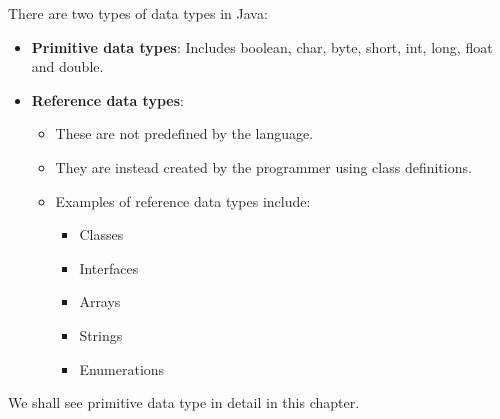 \setlength{\columnsep}{5pt}

\begin{flushleft}
	
	There are two types of data types in Java:
	
	\begin{itemize}
		\item \textbf{Primitive data types}: Includes boolean, char, byte, short, int, long, float and double.
		\item \textbf{Reference data types}: 
		\begin{itemize}
			\item These are not predefined by the language.
			\item They are instead created by the programmer using class definitions. \item Examples of reference data types include:
			\begin{itemize}
				\item Classes
				\item Interfaces
				\item Arrays
				\item Strings
				\item Enumerations
			\end{itemize}
		\end{itemize}
	
	\end{itemize}
	
	We shall see primitive data type in detail in this chapter.
	
\end{flushleft}

\newpage